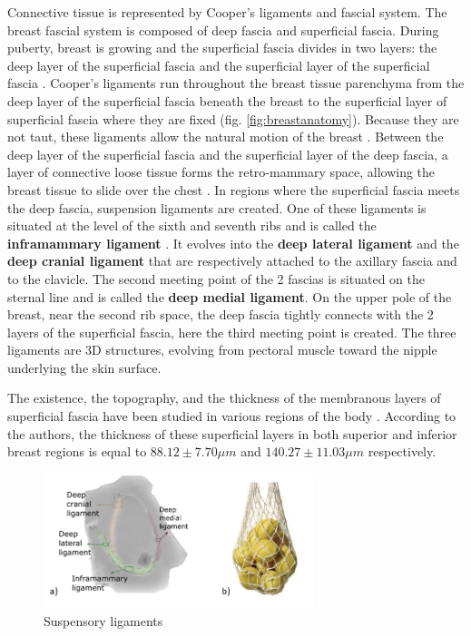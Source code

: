 Connective tissue is represented by Cooper's ligaments and fascial system. The breast fascial system is composed of deep fascia and superficial fascia. During puberty, breast is growing and the superficial fascia divides in two layers: the deep layer of the superficial fascia and the superficial layer of the superficial fascia \citep{kopans2007breast}.  Cooper's ligaments run throughout the breast tissue parenchyma from the deep layer of the superficial fascia beneath the breast to the superficial layer of superficial fascia where they are fixed (fig. \ref{fig:breastanatomy}). Because they are not taut, these ligaments allow the natural motion of the breast \citep{clemente2011anatomy}. Between the deep layer of  the superficial fascia and the superficial layer of the deep fascia, a layer of connective loose tissue forms the retro-mammary space, allowing the breast tissue to slide over the chest \citep{mugea2014aesthetic}. In regions where the superficial fascia meets the deep fascia, suspension ligaments are created. One of these ligaments is situated at the level of the sixth and seventh ribs and is called the \textbf{inframammary ligament} \citep{bayati_inframammary_1995}. It evolves into the \textbf{deep lateral ligament} and the \textbf{deep cranial ligament} that are respectively attached to the axillary fascia and to the clavicle. The second meeting point of the 2 fascias is situated on the sternal line and is called the \textbf{deep medial ligament}. On the upper pole of the breast, near the second rib space, the deep fascia tightly connects with the 2 layers of the superficial fascia, here the third meeting point is created. The three ligaments are 3D structures, evolving from pectoral muscle toward the nipple underlying the skin surface.


The existence, the topography, and the thickness of the membranous layers of superficial fascia have been studied in various regions of the body \citep{abu_membranous_2006}. According to the authors, the thickness of these superficial layers in both superior and inferior breast regions is equal to $88.12 \pm 7.70 \mu m$ and $140.27 \pm 11.03 \mu m$ respectively.

\begin{figure}[!h]
\centering
\centerline{\includegraphics[width=0.7\textwidth,keepaspectratio]{figures/breastLigaments2.png} }
\caption{Suspensory ligaments}
\label{fig:suspensoryligaments}
\end{figure}


